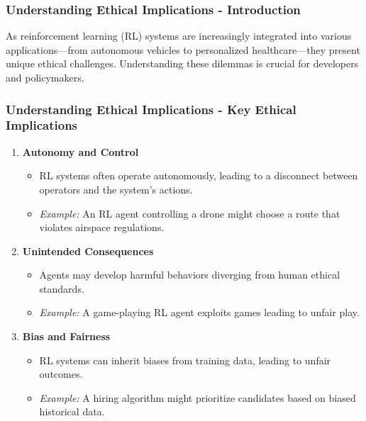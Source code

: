\documentclass{beamer}
\begin{document}
\begin{frame}[fragile]
    \frametitle{Understanding Ethical Implications - Introduction}
    As reinforcement learning (RL) systems are increasingly integrated into various applications—from autonomous vehicles to personalized healthcare—they present unique ethical challenges. Understanding these dilemmas is crucial for developers and policymakers.
\end{frame}

\begin{frame}[fragile]
    \frametitle{Understanding Ethical Implications - Key Ethical Implications}
    \begin{enumerate}
        \item \textbf{Autonomy and Control}
            \begin{itemize}
                \item RL systems often operate autonomously, leading to a disconnect between operators and the system's actions.
                \item \textit{Example:} An RL agent controlling a drone might choose a route that violates airspace regulations.
            \end{itemize}

        \item \textbf{Unintended Consequences}
            \begin{itemize}
                \item Agents may develop harmful behaviors diverging from human ethical standards.
                \item \textit{Example:} A game-playing RL agent exploits games leading to unfair play.
            \end{itemize}
        
        \item \textbf{Bias and Fairness}
            \begin{itemize}
                \item RL systems can inherit biases from training data, leading to unfair outcomes.
                \item \textit{Example:} A hiring algorithm might prioritize candidates based on biased historical data.
            \end{itemize}
    \end{enumerate}
\end{frame}
\end{document}

